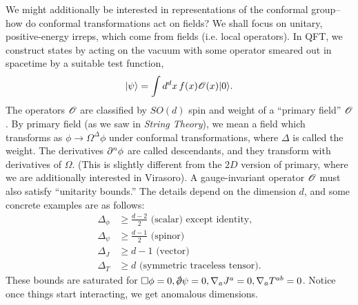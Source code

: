 We might additionally be interested in representations of the conformal group-- how do conformal transformations act on fields? We shall focus on unitary, positive-energy irreps, which come from fields (i.e. local operators). In QFT, we construct states by acting on the vacuum with some operator smeared out in spacetime by a suitable test function,
\begin{equation}
    \lvert\psi\rangle=\int d^dx \, f(x) \mathscr O(x) \lvert0\rangle.
\end{equation}
The operators $\mathscr O$ are classified by $SO(d)$ spin and weight of a ``primary field'' $\mathscr O$. By primary field (as we saw in \emph{String Theory}), we mean a field which transforms as $\phi \to \Omega^\Delta \phi$ under conformal transformations, where $\Delta$ is called the weight. The derivatives $\partial^n \phi$ are called descendants, and they transform with derivatives of $\Omega$. (This is slightly different from the $2D$ version of primary, where we are additionally interested in Virasoro). A gauge-invariant operator $\mathscr O$ must also satisfy ``unitarity bounds.'' The details depend on the dimension $d$, and some concrete examples are as follows:
\begin{align}
    \Delta_\phi &\geq \frac{d-2}{2}\text{ (scalar) except identity},\\
    \Delta_\psi &\geq \frac{d-1}{2} \text{ (spinor)}\\
    \Delta_J &\geq d-1 \text{ (vector)}\\
    \Delta_T &\geq d \text{ (symmetric traceless tensor)}.
\end{align}
These bounds are saturated for $\Box \phi=0, \slashed{\p} \psi=0, \nabla_a J^a =0, \nabla_a T^{ab}=0$. Notice once things start interacting, we get anomalous dimensions.